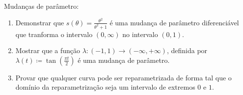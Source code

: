 \documentclass[../main.tex]{subfiles}
\begin{document}
\begin{exercicio}{3}
	Mudanças de parâmetro:
	
	\begin{enumerate}[label=\alph*)]
		\item Demonstrar que $s(\theta)=\frac{\theta^2}{\theta^2+1}$ é uma mudança de parâmetro diferenciável que tranforma o intervalo $(0,\infty)$ no intervalo $(0, 1)$.
		\item Mostrar que a função $\lambda:(-1, 1)\rightarrow(-\infty,+\infty)$, definida por $\lambda(t)\coloneqq \tan(\frac{\pi t}{2})$ é uma mudança de parâmetro.
		\item  Provar que qualquer curva pode ser reparametrizada de forma tal que o domínio da reparametrização seja um intervalo de extremos $0$ e $1$.
	\end{enumerate}
\end{exercicio}
\end{document}
